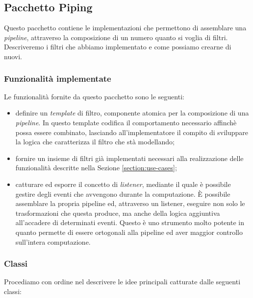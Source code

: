 \subsection{Pacchetto Piping}
\label{subsection:piping-package-description}
Questo pacchetto contiene le implementazioni che permettono di
assemblare una \emph{pipeline}, attraverso la composizione di un
numero quanto si voglia di filtri. Descriveremo i filtri che abbiamo
implementato e come possiamo crearne di nuovi.

\subsubsection*{Funzionalit\`a implementate}

Le funzionalit\`a fornite da questo pacchetto sono le seguenti:
\begin{itemize}
\item definire un \emph{template} di filtro, componente atomica per la
  composizione di una \emph{pipeline}. In questo template codifica il
  comportamento necessario affinch\`e possa essere combinato,
  lasciando all'implementatore il compito di sviluppare la logica che
  caratterizza il filtro che st\`a modellando;
\item fornire un insieme di filtri gi\`a implementati necessari alla
  realizzazione delle funzionalit\`a descritte nella Sezione
  \ref{section:use-cases};
\item catturare ed esporre il concetto di \emph{listener}, mediante il
  quale \`e possibile gestire degli eventi che avvengono durante la
  computazione. \`E possibile assemblare la propria pipeline ed,
  attraverso un listener, eseguire non solo le trasformazioni che
  questa produce, ma anche della logica aggiuntiva all'accadere di
  determinati eventi. Questo \`e uno strumento molto potente in quanto
  permette di essere ortogonali alla pipeline ed aver maggior
  controllo sull'intera computazione.
\end{itemize}

\subsubsection*{Classi}
Procediamo con ordine nel descrivere le idee principali catturate
dalle seguenti classi:

